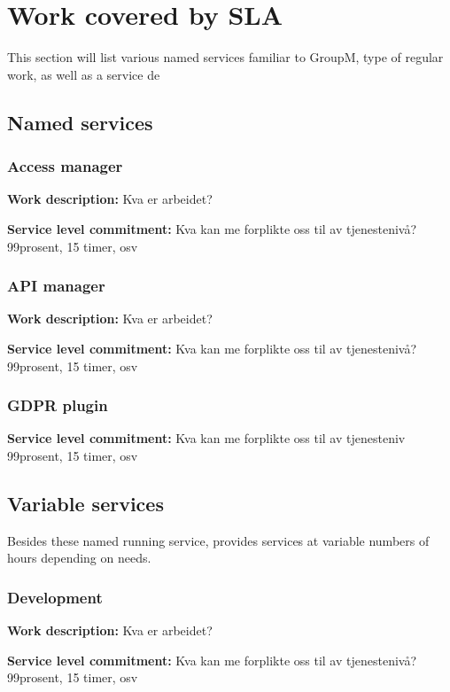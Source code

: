 \section{Work covered by SLA}
This section will list various named services familiar to GroupM, type of regular work, as well as a service de


\subsection{Named services}


\subsubsection{Access manager}
\textbf{Work description:} Kva er arbeidet?

\textbf{Service level commitment:} Kva kan me forplikte oss til av tjenestenivå? 99prosent, 15 timer, osv



\subsubsection{API manager}
\textbf{Work description:} Kva er arbeidet?

\textbf{Service level commitment:} Kva kan me forplikte oss til av tjenestenivå? 99prosent, 15 timer, osv

\subsubsection{GDPR plugin}

\textbf{Service level commitment:} Kva kan me forplikte oss til av tjenesteniv 99prosent, 15 timer, osv

\subsection{Variable services}

Besides these named running service, \suppliername provides services at variable numbers of hours depending on \customername needs.

\subsubsection{Development}
\textbf{Work description:} Kva er arbeidet?

\textbf{Service level commitment:} Kva kan me forplikte oss til av tjenestenivå? 99prosent, 15 timer, osv

